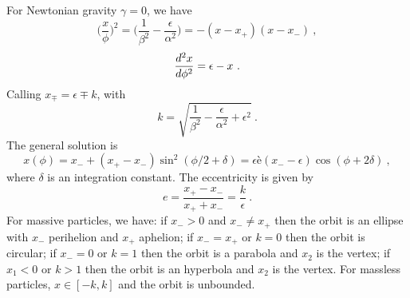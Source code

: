     For Newtonian gravity $\gamma = 0$, we have
    \begin{equation*}
        \Big ( \frac{x}{\phi} \Big)^2 = \Big (\frac{1}{\beta^2} - \frac{\epsilon}{\alpha^2} \Big) = - (x - x_+) (x - x_-) ~,
    \end{equation*}
    \begin{equation*}
        \frac{d^2x}{d\phi^2} = \epsilon - x ~.
    \end{equation*}
    Calling $x_\mp = \epsilon \mp k$, with 
    \begin{equation*}
        k = \sqrt{\frac{1}{\beta^2} - \frac{\epsilon}{\alpha^2} + \epsilon^2} ~.
    \end{equation*}
    The general solution is 
    \begin{equation*}
        x (\phi) = x_- + (x_+ - x_-) \sin^2 (\phi/2 + \delta) = \epsilon è (x_- - \epsilon) \cos(\phi + 2 \delta) ~,
    \end{equation*}
    where $\delta$ is an integration constant. The eccentricity is given by 
    \begin{equation*}
        e = \frac{x_+ - x_-}{x_+ + x_-} = \frac{k}{\epsilon} ~.
    \end{equation*}
    For massive particles, we have: if $x_- > 0$ and $x_- \neq x_+$ then the orbit is an ellipse with $x_-$ perihelion and $x_+$ aphelion; if $x_- = x_+$ or $k=0$ then the orbit is circular; if $x_- = 0$ or $k = 1$ then the orbit is a parabola and $x_2$ is the vertex; if $x_1 < 0$ or $k > 1$ then the orbit is an hyperbola and $x_2$ is the vertex. For massless particles, $x \in [-k, k]$ and the orbit is unbounded.

